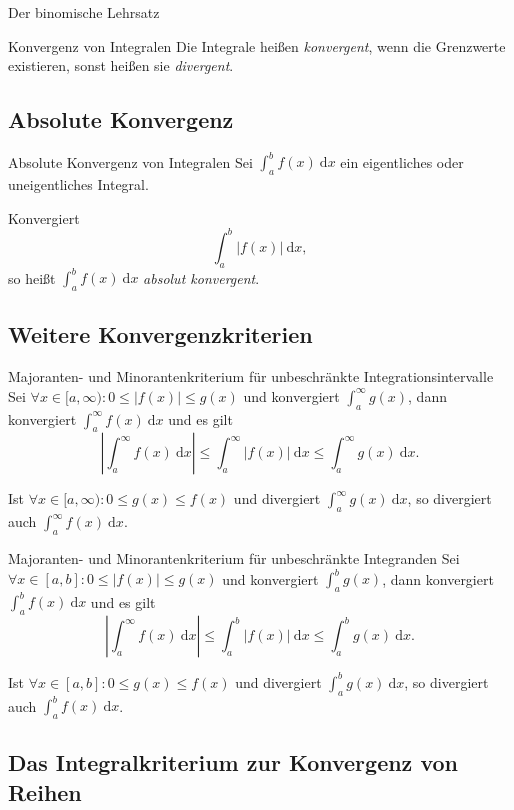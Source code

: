 \documentclass[german]{spicker}
\renewcommand{\abs}[1]{\left| #1 \right|}
\newcommand{\dx}{~\mathrm{d}x}
\begin{document}
\begin{defi}{Der binomische Lehrsatz}
\begin{defi}{Konvergenz von Integralen}
    Die Integrale heißen \emph{konvergent}, wenn die Grenzwerte existieren, sonst heißen sie \emph{divergent}.
\end{defi}

\subsection{Absolute Konvergenz}

\begin{defi}{Absolute Konvergenz von Integralen}
    Sei $\int^b_a f(x) \dx$ ein eigentliches oder uneigentliches Integral.

    Konvergiert
    $$
        \int^b_a \abs{f(x)} \dx,
    $$
    so heißt $\int^b_a f(x) \dx$ \emph{absolut konvergent}.
\end{defi}

\subsection{Weitere Konvergenzkriterien}

\begin{defi}{Majoranten- und Minorantenkriterium für unbeschränkte Integrationsintervalle}
    Sei $\forall x \in [a, \infty) : 0 \leq \abs{f(x)} \leq g(x)$ und konvergiert $\int^\infty_a g(x)$, dann konvergiert $\int^\infty_a f(x) \dx$ und es gilt
    $$
        \abs{\int^\infty_a f(x) \dx} \leq \int^\infty_a \abs{f(x)} \dx \leq \int^\infty_a g(x) \dx.
    $$

    Ist $\forall x\in [a, \infty) : 0\leq g(x) \leq f(x)$ und divergiert $\int^\infty_a g(x) \dx$, so divergiert auch $\int^\infty_a f(x) \dx$.
\end{defi}

\begin{defi}{Majoranten- und Minorantenkriterium für unbeschränkte Integranden}
    Sei $\forall x \in [a, b] : 0 \leq \abs{f(x)} \leq g(x)$ und konvergiert $\int^b_a g(x)$, dann konvergiert $\int^b_a f(x) \dx$ und es gilt
    $$
        \abs{\int^\infty_a f(x) \dx} \leq \int^b_a \abs{f(x)} \dx \leq \int^b_a g(x) \dx.
    $$

    Ist $\forall x\in [a, b] : 0\leq g(x) \leq f(x)$ und divergiert $\int^b_a g(x) \dx$, so divergiert auch $\int^b_a f(x) \dx$.
\end{defi}

\subsection{Das Integralkriterium zur Konvergenz von Reihen}


\end{defi}
\end{document}

